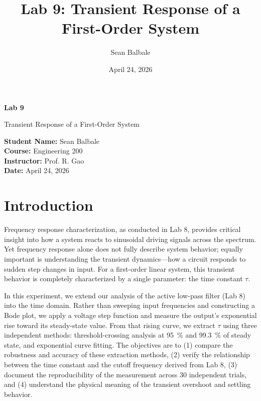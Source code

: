 \documentclass[11pt]{article}
\title{\textbf{Lab 9: Transient Response of a First-Order System}}
\author{Sean Balbale}
\date{April 24, 2026}
\begin{document}
\begin{titlepage}
  \begin{center}
    \vspace*{1in}

    \Huge
    \textbf{Lab 9}

    \LARGE
    Transient Response of a First-Order System

    \vspace{3in}

    \textbf{Student Name:} Sean Balbale
    \\ \textbf{Course:} Engineering 200
    \\ \textbf{Instructor:} Prof. R. Gao
    \\ \textbf{Date:} April 24, 2026

    \vfill

  \end{center}
\end{titlepage}

\newpage

\section{Introduction}
Frequency response characterization, as conducted in Lab 8, provides critical insight into how a system reacts to sinusoidal driving signals across the spectrum. Yet frequency response alone does not fully describe system behavior; equally important is understanding the transient dynamics—how a circuit responds to sudden step changes in input. For a first-order linear system, this transient behavior is completely characterized by a single parameter: the time constant $\tau$.

In this experiment, we extend our analysis of the active low-pass filter (Lab 8) into the time domain. Rather than sweeping input frequencies and constructing a Bode plot, we apply a voltage step function and measure the output's exponential rise toward its steady-state value. From that rising curve, we extract $\tau$ using three independent methods: threshold-crossing analysis at \SI{95}{\percent} and \SI{99.3}{\percent} of steady state, and exponential curve fitting. The objectives are to (1) compare the robustness and accuracy of these extraction methods, (2) verify the relationship between the time constant and the cutoff frequency derived from Lab 8, (3) document the reproducibility of the measurement across 30 independent trials, and (4) understand the physical meaning of the transient overshoot and settling behavior.
\end{document}
